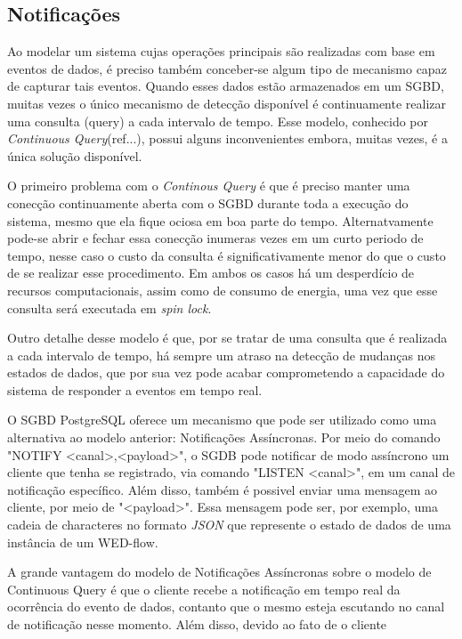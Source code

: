 \documentclass[conference]{IEEEtran}
\begin{document}
\subsection{Notificações}
Ao modelar um sistema cujas operações principais são realizadas com base em eventos de dados, é preciso também conceber-se
algum tipo de mecanismo capaz de capturar tais eventos. Quando esses dados estão armazenados em um SGBD, muitas vezes o
único mecanismo de detecção disponível é continuamente realizar uma consulta (query) a cada intervalo de tempo. Esse modelo,
conhecido por \emph{Continuous Query}(ref...), possui alguns inconvenientes embora, muitas vezes, é a única solução disponível.
\par O primeiro problema com o \emph{Continous Query} é que é preciso manter uma conecção continuamente aberta com
o SGBD durante toda a execução do sistema, mesmo que ela fique ociosa em boa parte do tempo. Alternatvamente pode-se abrir e fechar essa conecção 
inumeras vezes em um curto periodo de tempo, nesse caso o custo da consulta é significativamente menor do que o custo de
se realizar esse procedimento. Em ambos os casos há um desperdício de recursos computacionais, assim como de consumo de energia, uma
vez que esse consulta será executada em \emph{spin lock}.
\par Outro detalhe desse modelo é que, por se tratar de uma consulta que é realizada a cada intervalo de tempo, há sempre um
atraso na detecção de mudanças nos estados de dados, que por sua vez pode acabar comprometendo a capacidade do sistema
de responder a eventos em tempo real.
\par O SGBD PostgreSQL oferece um mecanismo que pode ser utilizado como uma alternativa ao modelo anterior: Notificações Assíncronas.
Por meio do comando "NOTIFY <canal>,<payload>", o SGDB pode notificar de modo assíncrono um cliente que tenha se registrado, via comando "LISTEN <canal>", 
em um canal de notificação específico. Além disso, também é possivel enviar uma mensagem ao cliente, por meio de "<payload>". Essa mensagem pode
ser, por exemplo, uma cadeia de characteres no formato \emph{JSON} que represente o estado de dados de uma instância de um WED-flow.
\par A grande vantagem do modelo de Notificações Assíncronas sobre o modelo de Continuous Query é que o cliente recebe a notificação em tempo real
da ocorrência do evento de dados, contanto que o mesmo esteja escutando no canal de notificação nesse momento. Além disso, devido ao fato de o cliente
\end{document}
